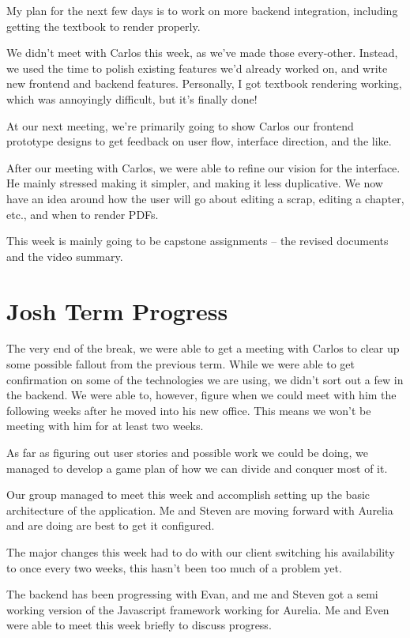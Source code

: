 \documentclass[onecolumn, draftclsnofoot,10pt, compsoc]{IEEEtran}
\begin{document}
My plan for the next few days is to work on more backend integration, 
including getting the textbook to render properly.

We didn't meet with Carlos this week, as we've made those every-other. 
Instead, we used the time to polish existing features we'd already worked on, 
and write new frontend and backend features. Personally, I got textbook 
rendering working, which was annoyingly difficult, but it's finally done!

At our next meeting, we're primarily going to show Carlos our frontend 
prototype designs to get feedback on user flow, interface direction, 
and the like.

After our meeting with Carlos, we were able to refine our vision for the 
interface. He mainly stressed making it simpler, and making it less duplicative. 
We now have an idea around how the user will go about editing a scrap, editing 
a chapter, etc., and when to render PDFs.

This week is mainly going to be capstone assignments -- the revised documents 
and the video summary.


\section{Josh Term Progress}
The very end of the break, we were able to get a meeting with Carlos to clear 
up some possible fallout from the previous term. While we were able to get 
confirmation on some of the technologies we are using, we didn't sort out a 
few in the backend. We were able to, however, figure when we could meet with 
him the following weeks after he moved into his new office. This means we won't 
be meeting with him for at least two weeks.

As far as figuring out user stories and possible work we could be doing, we 
managed to develop a game plan of how we can divide and conquer most of it.

Our group managed to meet this week and accomplish setting up the basic 
architecture of the application. Me and Steven are moving forward with 
Aurelia and are doing are best to get it configured. 


The major changes this week had to do with our client switching his 
availability to once every two weeks, this hasn't been too much of a 
problem yet.

The backend has been progressing with Evan, and me and Steven got a semi 
working version of the Javascript framework working for Aurelia. Me and 
Even were able to meet this week briefly to discuss progress.
\end{document}
